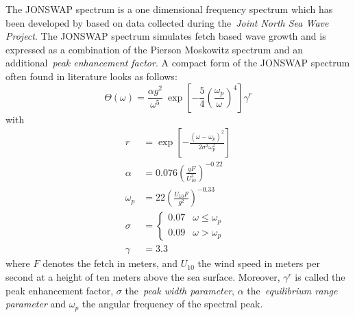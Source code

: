 %
The JONSWAP spectrum is a one dimensional frequency spectrum  which has been 
developed by \citet{article:Hasselman1973} based on data 
collected during the~\emph{Joint North Sea Wave Project}. The JONSWAP spectrum 
simulates fetch based wave growth and is expressed as a combination of the 
Pierson Moskowitz spectrum and an additional~\emph{peak enhancement factor}. A 
compact form of the JONSWAP spectrum often found in literature looks as follows:
%
\begin{equation}
\label{eq:jonswap_omega}
 \Theta(\omega) = \frac{\alpha
g^2}{\omega^5}~\exp\left[-\frac{5}{4}\left(\frac{\omega_p}{\omega}
\right)^4\right]\gamma^r
\end{equation}
with
\begin{align*}
r& = \exp\left[-\frac{\left(\omega -
\omega_p\right)^2}{2\sigma^2\omega_p^2}\right] \\
\alpha &= 0.076\left(\frac{gF}{U_{10}^2}\right)^{-0.22} \\
\omega_{p} &= 22\left(\frac{U_{10}F}{g^2}\right)^{-0.33} \\
\sigma &= \begin{cases}
	0.07 & \omega\leq\omega_p\\
	0.09 & \omega > \omega_p
    \end{cases} \\
\gamma &= 3.3
\end{align*}
where $F$ denotes the fetch in meters, and $U_{10}$ the wind speed in meters per 
second at a height of ten meters above the sea surface. Moreover, $\gamma^r$ is 
called the peak enhancement factor, $\sigma$ the~\emph{peak width parameter}, 
$\alpha$ the~\emph{equilibrium range parameter} and $\omega_p$ the angular 
frequency of the spectral peak.
%
